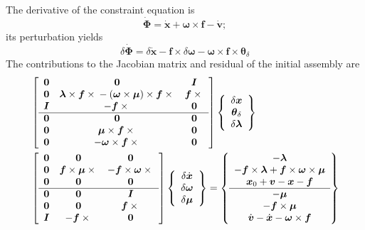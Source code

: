 \documentclass[10pt,dvips,fleqn]{report}
\newcommand{\T}[1]{\boldsymbol{#1}}
\begin{document}
The derivative of the constraint equation is
\begin{equation}
	\dot{\T{\Phi}}
	= \dot{\T{x}}
	+ \T{\omega}\times\T{f}
	- \dot{\T{v}} ;
\end{equation}
its perturbation yields
\begin{equation}
	\delta\dot{\T{\Phi}}
	= \delta\dot{\T{x}}
	- \T{f}\times\delta\T{\omega}
	- \T{\omega}\times\T{f}\times\T{\theta}_{\delta}
\end{equation}
The contributions to the Jacobian matrix and residual 
of the initial assembly are
\begin{align}
	& \sqbr{\matr{ccc}{
		\T{0} & \T{0} & \T{I} \\				%
		\T{0} & \T{\lambda}\times\T{f}\times{}
			- \plbr{\T{\omega}\times\T{\mu}}\times\T{f}\times{} &
			\T{f}\times{} \\				%
		\T{I} & -\T{f}\times{} & \T{0} \\			%
%
	\hline
		\T{0} & \T{0} & \T{0} \\				%
		\T{0} & \T{\mu}\times\T{f}\times{} & \T{0} \\		%
		\T{0} & -\T{\omega}\times\T{f}\times{} & \T{0}		%
	}} \cubr{\cvvect{
		\delta\T{x} \\
		\T{\theta}_{\delta} \\
		\delta\T{\lambda}
	}} \nonumber \\
	& \sqbr{\matr{ccc}{
		\T{0} & \T{0} & \T{0} \\				%
		\T{0} & \T{f}\times\T{\mu}\times{} &
			-\T{f}\times\T{\omega}\times{} \\		%
		\T{0} & \T{0} & \T{0} \\				%
%
	\hline
		\T{0} & \T{0} & \T{I} \\				%
		\T{0} & \T{0} & \T{f}\times{} \\			%
		\T{I} & -\T{f}\times{} & \T{0} 				%
	}} \cubr{\cvvect{
		\delta\dot{\T{x}} \\
		\delta\T{\omega} \\
		\delta\T{\mu}
	}} %
	= \cubr{\cvvect{
		- \T{\lambda} \\
		- \T{f}\times\T{\lambda}
			+ \T{f}\times\T{\omega}\times\T{\mu} \\
		\T{x}_0 + \T{v} - \T{x} - \T{f} \\
%
	\hline
		- \T{\mu} \\
		- \T{f}\times\T{\mu} \\
		\dot{\T{v}} - \dot{\T{x}} - \T{\omega}\times\T{f}
	}}
\end{align}
\end{document}
